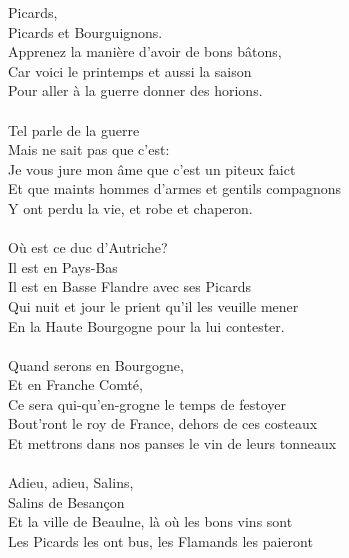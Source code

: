 
 Picards,
\\Picards et Bourguignons.
\\Apprenez la manière d'avoir de bons bâtons,
\\Car voici le printemps et aussi la saison
\\Pour aller à la guerre donner des horions.
\\\\Tel parle de la guerre
\\Mais ne sait pas que c'est:
\\Je vous jure mon âme que c'est un piteux faict
\\Et que maints hommes d'armes et gentils compagnons
\\Y ont perdu la vie, et robe et chaperon.
\\\\Où est ce duc d'Autriche?
\\Il est en Pays-Bas
\\Il est en Basse Flandre avec ses Picards
\\Qui nuit et jour le prient qu'il les veuille mener
\\En la Haute Bourgogne pour la lui contester.
\\\\Quand serons en Bourgogne,
\\Et en Franche Comté,
\\Ce sera qui-qu'en-grogne le temps de festoyer
\\Bout'ront le roy de France, dehors de ces costeaux
\\Et mettrons dans nos panses le vin de leurs tonneaux
\\\\Adieu, adieu, Salins,
\\Salins de Besançon
\\Et la ville de Beaulne, là où les bons vins sont
\\Les Picards les ont bus, les Flamands les paieront
